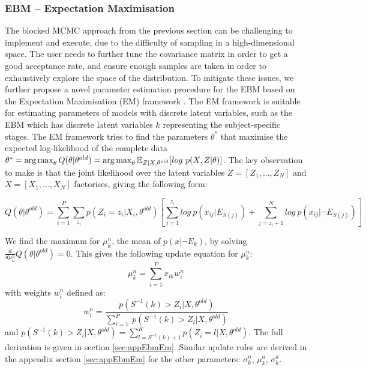 \subsubsection{EBM -- Expectation Maximisation}
\label{sec:ebmEM}

The blocked MCMC approach from the previous section can be challenging to implement and execute, due to the difficulty of sampling in a high-dimensional space. The user needs to further tune the covariance matrix in order to get a good acceptance rate, and ensure enough samples are taken in order to exhaustively explore the space of the distribution. To mitigate these issues, we further propose a novel parameter estimation procedure for the EBM based on the Expectation Maximisation (EM) framework \cite{bishop2007pattern}. The EM framework is suitable for estimating parameters of models with discrete latent variables, such as the EBM which has discrete latent variables $k$ representing the subject-specific stages. The EM framework tries to find the parameters $\theta^*$ that maximise the expected log-likelihood of the complete data $\theta^* = \argmax_{\theta} Q(\theta | \theta^{old}) = \argmax_{\theta} \mathbb{E}_{Z|X,\theta^{old}}[log\ p(X,Z|\theta)]$. The key observation to make is that the joint likelihood over the latent variables $Z = [Z_1, ..., Z_N]$ and $X = [X_1, ..., X_N]$ factorises, giving the following form:

\begin{equation}
Q(\theta | \theta^{old}) = \sum_{i=1}^P \sum_{z_i} p(Z_i = z_i|X_i, \theta^{old}) \left[ \sum_{j=1}^{z_i} log\ p(x_{ij}|E_{S(j)}) + \sum_{j=z_i + 1}^N log\ p(x_{ij}| \neg E_{S(j)}) \right]
\end{equation}

We find the maximum for $\mu_k^n$, the mean of $p(x|\neg E_k)$, by solving $\frac{d}{d\mu_k^n}Q(\theta | \theta^{old}) = 0 $. This gives the following update equation for $\mu_k^n$:
\begin{equation}
 \mu_k^n = \sum_{i=1}^P x_{ik} w_i^n
\end{equation}
with weights $w_i^n$ defined as:
\begin{equation}
w_i^n = \frac{p(S^{-1}(k) > Z_i | X, \theta^{old})}{\sum_{i=1}^P \ p(S^{-1}(k) > Z_i | X, \theta^{old})}
\end{equation}
and $p(S^{-1}(k) > Z_i | X, \theta^{old}) = \sum_{l=S^{-1}(k)+1}^{K} p(Z_i = l | X, \theta^{old})$. The full derivation is given in section \ref{sec:appEbmEm}. Similar update rules are derived in the appendix section \ref{sec:appEbmEm} for the other parameters: $\sigma_k^n$, $\mu_k^a$, $\sigma_k^a$. 

